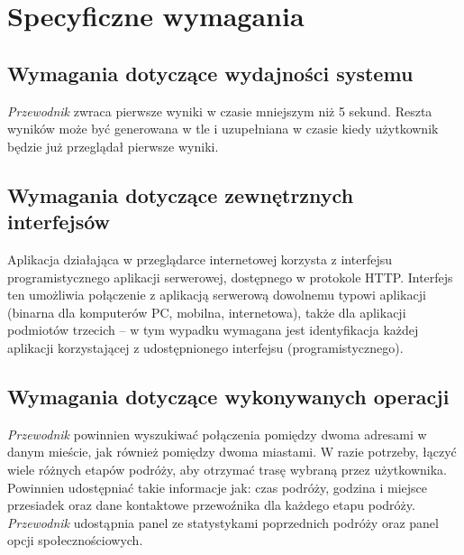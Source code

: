 \documentclass[12pt,a4paper]{report}
\begin{document}
\section{Specyficzne wymagania}
\subsection{Wymagania dotyczące wydajności systemu}
	\emph{Przewodnik} zwraca pierwsze wyniki w czasie mniejszym niż 5 sekund. Reszta wyników może być generowana w tle i uzupełniana w czasie kiedy użytkownik będzie już przeglądał pierwsze wyniki.

\subsection{Wymagania dotyczące zewnętrznych interfejsów}
Aplikacja działająca w przeglądarce internetowej korzysta z interfejsu programistycznego aplikacji serwerowej, dostępnego w protokole HTTP. Interfejs ten umożliwia połączenie z aplikacją serwerową dowolnemu typowi aplikacji (binarna dla komputerów PC, mobilna, internetowa), także dla aplikacji podmiotów trzecich -- w tym wypadku wymagana jest identyfikacja każdej aplikacji korzystającej z udostępnionego interfejsu (programistycznego).
\subsection{Wymagania dotyczące wykonywanych operacji}
	\emph{Przewodnik} powinnien wyszukiwać połączenia pomiędzy dwoma adresami w danym mieście, jak również pomiędzy dwoma miastami. W razie potrzeby, łączyć wiele różnych etapów podróży, aby otrzymać trasę wybraną przez użytkownika. Powinnien udostępniać takie informacje jak: czas podróży, godzina i miejsce przesiadek oraz dane kontaktowe przewoźnika dla każdego etapu podróży. \emph{Przewodnik} udostąpnia panel ze statystykami poprzednich podróży oraz panel opcji społecznościowych.
\end{document}
